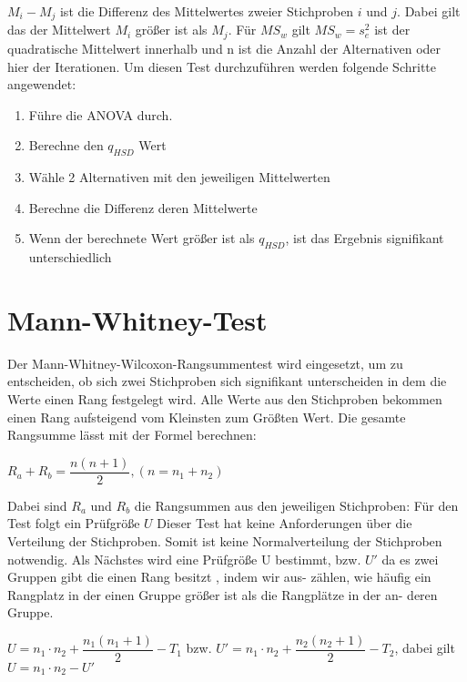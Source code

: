 $M_i - M_j$ ist die Differenz des Mittelwertes zweier Stichproben $i$ und $j$.
Dabei gilt das der Mittelwert $M_i$ größer ist als $M_j$.
Für $MS_w$ gilt $MS_w = s^2_{e}$ ist der quadratische Mittelwert innerhalb und n ist die Anzahl
der Alternativen oder hier der Iterationen.
Um diesen Test durchzuführen werden folgende Schritte angewendet:

\begin{center}
  \begin{enumerate}
    \item Führe die ANOVA durch. 
    \item Berechne den $q_{HSD}$ Wert
    \item Wähle 2 Alternativen mit den jeweiligen Mittelwerten
    \item Berechne die Differenz deren Mittelwerte
    \item Wenn der berechnete Wert größer ist als $q_{HSD}$, ist das Ergebnis signifikant unterschiedlich 
  \end{enumerate}
\end{center}


\section{Mann-Whitney-Test}
Der Mann-Whitney-Wilcoxon-Rangsummentest \cite{statistik_sozialwissenschaften} \cite{u_test}
wird eingesetzt, um zu entscheiden, ob sich zwei
Stichproben sich signifikant unterscheiden in dem die Werte einen Rang festgelegt wird. 
Alle Werte aus den Stichproben bekommen einen Rang aufsteigend vom Kleinsten zum Größten Wert.
Die gesamte Rangsumme lässt mit der Formel berechnen:
\begin{center}
  $R_a + R_b = \dfrac{n(n + 1)}{2}, (n = n_1 + n_2)$
\end{center}  

Dabei sind $R_a$ und $R_b$ die Rangsummen aus den jeweiligen Stichproben:
Für den Test folgt ein Prüfgröße $U$  
Dieser Test
hat keine Anforderungen über die Verteilung der Stichproben.
Somit ist keine Normalverteilung der Stichproben notwendig.
Als Nächstes wird eine
Prüfgröße U bestimmt, bzw. $U'$ da es zwei Gruppen gibt die einen Rang besitzt , indem wir aus-
zählen, wie häufig ein Rangplatz in der einen
Gruppe größer ist als die Rangplätze in der an-
deren Gruppe.

\begin{center}
  $U = n_1 \cdot n_2 + \dfrac{n_1 (n_1 + 1)}{2} - T_1$ bzw. $U' = n_1 \cdot n_2 + \dfrac{n_2 (n_2 + 1)}{2} - T_2$, dabei gilt $U = n_1 \cdot n_2 - U'$
\end{center}

